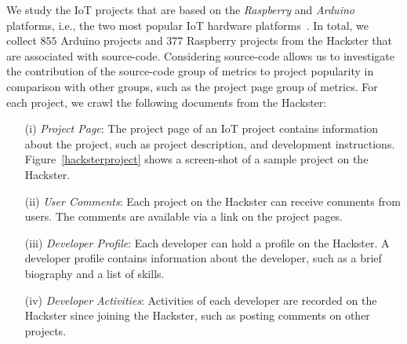 We study the IoT projects that are based on the \textit{Raspberry} and \textit{Arduino} platforms, i.e., the two most popular IoT hardware platforms~\cite{iotanalytics,hackster-survey-2016}.
In total, we collect $855$ Arduino projects and $377$ Raspberry projects from the Hackster that are associated with source-code. Considering source-code allows us to investigate the contribution of the source-code group of metrics to project popularity in comparison with other groups, such as the project page group of metrics.
For each project, we crawl the following documents from the Hackster:

\begin{enumerate}
	\item[(i)] \textit{Project Page}: The project page of an IoT project contains information about the project, such as project description, and development instructions. Figure~\ref{hacksterproject} shows a screen-shot of a sample project on the Hackster.
	\item[(ii)] \textit{User Comments}: Each project on the Hackster can receive comments from users. The comments are available via a link on the project pages.
	\item[(iii)] \textit{Developer Profile}: Each developer can hold a profile on the Hackster. A developer profile contains information about the developer, such as a brief biography and a list of skills.
	\item[(iv)] \textit{Developer Activities}: Activities of each developer are recorded on the Hackster since joining the Hackster, such as posting comments on other projects.
\end{enumerate}



